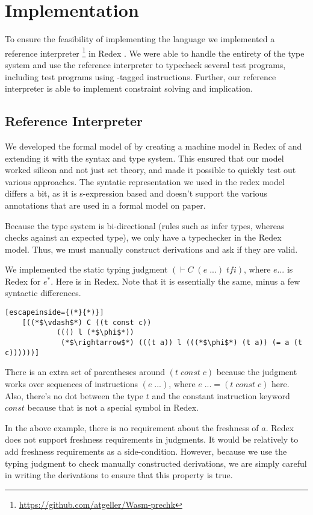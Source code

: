 \chapter{Implementation}
\label{chp:implementation}
To ensure the feasibility of implementing the \name language we implemented a reference interpreter \footnote{\hyperlink{https://github.com/atgeller/Wasm-prechk}{https://github.com/atgeller/Wasm-prechk}} in Redex \cite{redex}.
We were able to handle the entirety of the type system and use the reference interpreter to typecheck several test programs, including test programs using \prechk-tagged instructions.
Further, our reference interpreter is able to implement constraint solving and implication.

\section{Reference Interpreter}
We developed the formal model of \name by creating a machine model in Redex of \wasm and extending it with the \name syntax and type system.
This ensured that our model worked silicon and not just set theory, and made it possible to quickly test out various approaches.
The syntatic representation we used in the redex model differs a bit, as it is s-expression based and doesn't support the various annotations that are used in a formal model on paper.

Because the \name type system is bi-directional (rules such as  infer types, whereas  checks against an expected type), we only have a typechecker in the Redex model.
Thus, we must manually construct derivations and ask if they are valid.

We implemented the static typing judgment $(\vdash C\; (e\;...)\; tfi)$, where $e ...$ is Redex for $e^{*}$.
Here is  in Redex.
Note that it is essentially the same, minus a few syntactic differences.
\begin{lstlisting}[escapeinside={(*}{*)}]
    [((*$\vdash$*) C ((t const c))
            ((() l (*$\phi$*))
             (*$\rightarrow$*) (((t a)) l (((*$\phi$*) (t a)) (= a (t c))))))]
\end{lstlisting}
There is an extra set of parentheses around $(t\;const\;c)$ because the judgment works over sequences of instructions $(e\;...)$, where $e\;... = (t\;const\;c)$ here.
Also, there's no dot between the type $t$ and the constant instruction keyword $const$ because that is not a special symbol in Redex.

In the above example, there is no requirement about the freshness of $a$.
Redex does not support freshness requirements in judgments.
It would be relatively to add freshness requirements as a side-condition.
However, because we use the typing judgment to check manually constructed derivations, we are simply careful in writing the derivations to ensure that this property is true.

